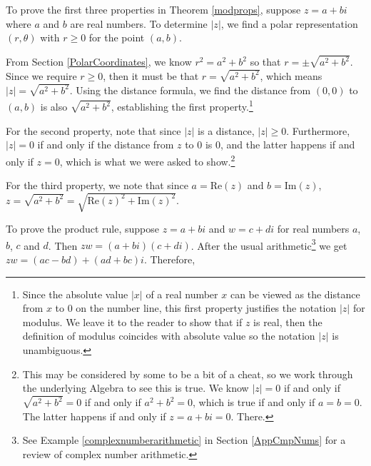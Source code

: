 \documentclass{ximera}
\begin{document}

\smallskip

To prove the first three properties in Theorem \ref{modprops}, suppose $z = a + bi$ where $a$ and $b$ are real numbers.  To determine $|z|$, we find a polar representation $(r,\theta)$ with $r \geq 0$ for the point $(a,b)$.  

\smallskip

From Section \ref{PolarCoordinates}, we know $r^2 = a^2 + b^2$ so that $r = \pm \sqrt{a^2+b^2}$.  Since we require $r \geq 0$, then it must be that $r = \sqrt{a^2 +b^2}$, which means $|z| = \sqrt{a^2+b^2}$.  Using the distance formula, we find the distance from $(0,0)$ to $(a,b)$ is also $\sqrt{a^2+b^2}$, establishing the first property.\footnote{Since the absolute value $|x|$ of a real number $x$ can be viewed as the distance from $x$ to $0$ on the number line, this first property justifies the notation $|z|$ for modulus.  We leave it to the reader to show that if $z$ is real, then the definition of modulus coincides with absolute value so the notation $|z|$ is unambiguous.}  

\smallskip

For the second property, note that since $|z|$ is a distance, $|z| \geq 0$.  Furthermore,  $|z| = 0$ if and only if the distance from $z$ to $0$ is $0$, and the latter happens if and only if $z = 0$, which is what we were asked to show.\footnote{This may be considered by some to be a bit of a cheat, so we work through the underlying Algebra to see this is true.  We know  $|z| = 0$ if and only if $\sqrt{a^2+b^2} = 0$ if and only if $a^2+b^2 = 0$, which is true if and only if $a = b = 0$.  The latter happens if and only if $z = a + bi =0$.  There.}  

\smallskip

For the third property, we note that since $a = \text{Re}(z)$ and $b = \text{Im}(z)$, $z = \sqrt{a^2+b^2} = \sqrt{\text{Re}(z)^2 + \text{Im}(z)^2}$.

\smallskip

To prove the product rule, suppose $z = a + bi$ and  $w = c + di$ for real numbers $a$, $b$, $c$ and $d$.  Then $zw = (a+bi)(c+di)$.  After the usual arithmetic\footnote{See Example \ref{complexnumberarithmetic} in Section \ref{AppCmpNums} for a review of complex number arithmetic.} we get $zw = (ac-bd) + (ad+bc)i$. Therefore,
\end{document}
